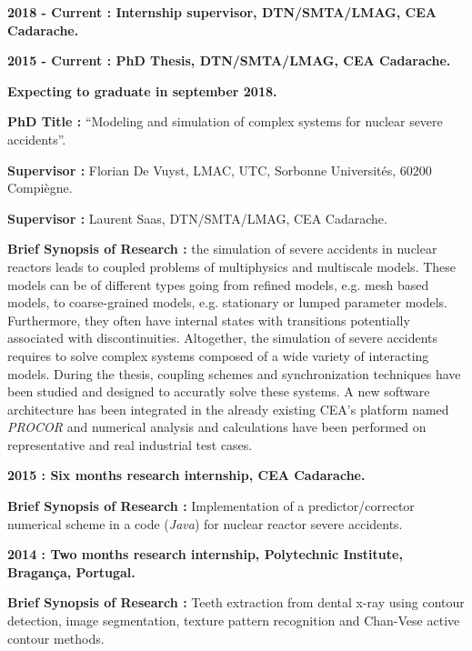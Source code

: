 \documentclass{article}
\renewenvironment{itemize}{
  \begin{list}{}{
      \setlength{\leftmargin}{1.5em}
      \setlength{\itemsep}{0.25em}
      \setlength{\parskip}{0pt}
      \setlength{\parsep}{0.25em}
    }
}{
  \end{list}
}
\begin{document}
	\begin{itemize}
		\item \textbf{2018 - Current : Internship supervisor, DTN/SMTA/LMAG, CEA Cadarache.}
		\item \textbf{2015 - Current : PhD Thesis, DTN/SMTA/LMAG, CEA Cadarache.}
			\begin{itemize}
				\item \textbf{Expecting to graduate in september 2018.}
				\item \textbf{PhD Title :} ``Modeling and simulation of complex systems for nuclear severe accidents''.
				\item \textbf{Supervisor :} Florian De Vuyst, LMAC, UTC, Sorbonne Universités, 60200 Compiègne.
				\item \textbf{Supervisor :} Laurent Saas, DTN/SMTA/LMAG, CEA Cadarache.
				\item \textbf{Brief Synopsis of Research :} the simulation of severe accidents in nuclear reactors leads to coupled problems of multiphysics and multiscale models. These models can be of different types going from refined models, e.g. mesh based models, to coarse-grained models, e.g. stationary or lumped parameter models. Furthermore, they often have internal states with transitions potentially associated with discontinuities. Altogether, the simulation of severe accidents requires to solve complex systems composed of a wide variety of interacting models. During the thesis, coupling schemes and synchronization techniques have been studied and designed to accuratly solve these systems. A new software architecture has been integrated in the already existing CEA's platform named \textit{PROCOR} and numerical analysis and calculations have been performed on representative and real industrial test cases.
			\end{itemize}
	\item \textbf{2015 : Six months research internship, CEA Cadarache.}
		\begin{itemize}
			\item \textbf{Brief Synopsis of Research :} Implementation of a predictor/corrector numerical scheme in a code (\textit{Java}) for nuclear reactor severe accidents.
		\end{itemize}
	\item \textbf{2014 : Two months research internship, Polytechnic Institute, Bragança, Portugal.}
		\begin{itemize}
			\item \textbf{Brief Synopsis of Research :} Teeth extraction from dental x-ray using contour detection, image segmentation, texture pattern recognition and Chan-Vese active contour methods.
		\end{itemize}
\end{itemize}  
\end{document}
